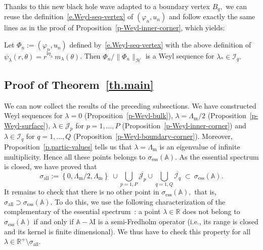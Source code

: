 \documentclass[AHL,Unicode,longabstracts]{cedram}
\DeclareMathOperator{\ess}{ess}
\DeclareMathOperator{\all}{all}
\newcommand{\calH}{\mathcal{H}}
\newcommand{\calI}{\mathcal{I}}
\newcommand{\calJ}{\mathcal{J}}
\newcommand{\bbA}{\mathbb{A}}
\newcommand{\bbR}{\mathbb{R}}
\newcommand{\rmi}{{\mathrm{i}}}
\newcommand{\Ident}{{\mathrm{I}}}
\newcommand{\Lm}{{\Lambda_{\mathrm{m}}}}
\begin{document}
Thanks to this new black hole wave adapted to a boundary vertex $B_q,$ we can reuse the definition~\eqref{e.Weyl-seq-vertex} of $(\varphi_n,u_n)$ and follow exactly the same lines as in the proof of Proposition~\ref{p-Weyl-inner-corner}, which yields:

\begin{prop}\label{p-Weyl-boundary-corner}
Let $\Phi_n := (\varphi_n,u_n)$ defined by~\eqref{e.Weyl-seq-vertex} with the above definition of $\psi_\lambda(r,\theta) = r^{\rmi\eta_\lambda}\ m_\lambda(\theta)$. Then $\Phi_n/\|\Phi_n\|_\calH$ is a Weyl sequence for $\lambda_* \in \calI_q.$
\end{prop}

\subsection{Proof of Theorem~\ref{th.main}}\label{s.proof-thm}
We can now collect the results of the preceding subsections. We have constructed Weyl sequences for $\lambda = 0$ (Proposition~\ref{p-Weyl-bulk}), $\lambda = \Lm/2$ (Proposition~\ref{p-Weyl-surface}), $\lambda \in \calJ_p$ for $p=1,\ldots,P$ (Proposition~\ref{p-Weyl-inner-corner}) and $\lambda \in \calI_q$ for $q=1,\ldots,Q$ (Proposition~\ref{p-Weyl-boundary-corner}). Moreover, Proposition~\ref{p.partic-values} tells us that $\lambda = \Lm$ is an eigenvalue of infinite multiplicity. Hence all these points belongs to $\sigma_{\ess}(\bbA).$ As the essential spectrum is closed, we have proved that
\[
\sigma_{\all} := \left\{0,\Lm/2,\Lm\right\} \; \cup \bigcup_{p=1,P} \overline{\calJ_p} \cup \bigcup_{q=1,Q} \overline{\calI_q} \; \subset\ \sigma_{\ess}(\bbA).
\]
It remains to check that there is no other point in $\sigma_{\ess}(\bbA),$ that is, $\sigma_{\all} \supset \sigma_{\ess}(\bbA).$ To do this, we use the following characterization of the complementary of the essential spectrum~\cite{Edm-Eva-87}: a point $\lambda \in \bbR$ does not belong to $\sigma_{\ess}(\bbA)$ if and only if $\bbA - \lambda \Ident$ is a semi-Fredholm operator (i.e., its range is closed and its kernel is finite dimensional). We thus have to check this property for all $\lambda \in \bbR^{+}\setminus\sigma_{\all}.$
\end{document}
